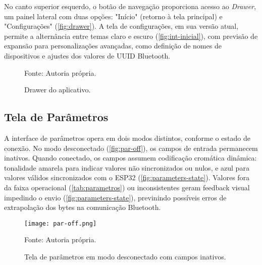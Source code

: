 No canto superior esquerdo, o botão de navegação proporciona acesso ao \textit{Drawer}, um painel lateral com duas opções: "Início" (retorno à tela principal) e "Configurações" (\autoref{fig:drawer}). A tela de configurações, em sua versão atual, permite a alternância entre temas claro e escuro (\autoref{fig:int-inicial}), com previsão de expansão para personalizações avançadas, como definição de nomes de dispositivos e ajustes dos valores de UUID Bluetooth.

\begin{figure}[H]
    \caption{Drawer do aplicativo.}
    \label{fig:drawer}
    \centering
    \hfill
    \hfill

    {\centering\footnotesize Fonte: Autoria própria.\par}

  \end{figure}

\subsection{Tela de Parâmetros}\label{subsec:parametros}
A interface de parâmetros opera em dois modos distintos, conforme o estado de conexão. No modo desconectado (\autoref{fig:par-off}), os campos de entrada permanecem inativos. Quando conectado, os campos assumem codificação cromática dinâmica: tonalidade amarela para indicar valores não sincronizados ou nulos, e azul para valores válidos sincronizados com o ESP32 (\autoref{fig:parameters-state}). Valores fora da faixa operacional (\autoref{tab:parametros}) ou inconsistentes geram feedback visual impedindo o envio (\autoref{fig:parameters-state}), previnindo possíveis erros de extrapolação dos bytes na comunicação Bluetooth.

\begin{figure}[H]
    \centering
    \caption{Tela de parâmetros em modo desconectado com campos inativos.}
    \label{fig:par-off}
    \texttt{[image: par-off.png]}

    {\centering\footnotesize Fonte: Autoria própria.\par}
\end{figure}

